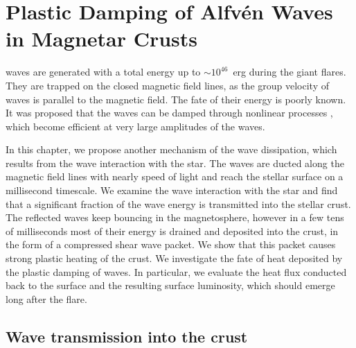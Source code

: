 
\def\T{{\mathcal T}}
\def\scr{s_{\rm cr}}
\def\Ts{T_{\rm s}}
\def\Tm{T_{\rm melt}}
\def\zmelt{z_{\rm melt}}
\def\beq{\begin{equation}}
\def\eeq{\end{equation}}
\def\sel{s_{\rm el}}
\def\spl{s_{\rm pl}}
\def\dspl{\dot{s}_{\rm pl}}
\def\sigcr{\sigma_{\rm cr}}
\def\Um{U_{\rm melt}}
\def\Uth{U_{\rm th}}
\def\Eq{Equation}
\def\Eqs{Equations}
\def\Ekin{E_{\rm kin}}
\def\Emag{E_{\rm mag}}
\def\Eel{E_{\rm el}}
\def\zd{z_{\rm damp}}
\def\Eaft{E_{\rm aft}}
\def\tc{t_{\rm cond}}
\def\LL{L}
\def\lw{l}
\def\Lum{\mathcal{L}}

\chapter[Plastic Damping  of Alfv\'en Waves in Magnetar Crusts]{Plastic Damping  of Alfv\'en Waves in Magnetar Crusts}
\label{chap:plastic-damping}
 \alfven waves are generated with a total energy up to $\sim 10^{46}$~erg during the giant flares. 
They are trapped on the closed magnetic field lines, as the group velocity of \alfven waves is parallel to the magnetic field. The fate of their energy is poorly known. 
It was proposed that the \alfven waves can be damped through nonlinear processes 
\citep{1998PhRvD..57.3219T}, which become efficient at very large amplitudes of the waves.

In this chapter, we propose another  mechanism of the \alfven wave dissipation, which 
results from the wave interaction with the star. 
The waves are ducted along the magnetic field lines with nearly speed of light and reach the stellar surface on a millisecond timescale. 
We examine the wave interaction with the star and find that a significant fraction of the wave energy is transmitted into the stellar crust. 
The reflected waves keep bouncing in the magnetosphere, however in a few tens of milliseconds most of their energy is drained and deposited into the crust, in the form of a compressed shear wave packet. 
We show that this packet causes strong plastic heating of the crust. 
We investigate the fate of heat deposited by the plastic damping of \alfven waves. 
In particular, we evaluate the heat flux conducted back to the surface and the resulting surface luminosity, which should emerge long after the flare. 

\section{Wave transmission into the crust}\label{wave-dyn}

